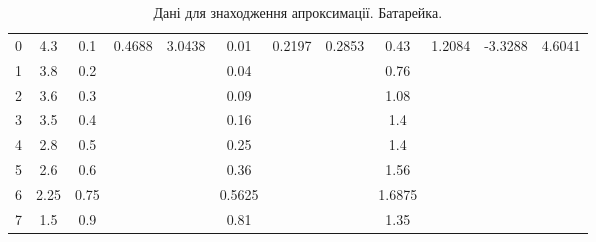 \documentclass[a4paper,12pt]{article}
\begin{document}
\begin{justify}
\begin{table}[htp]
\begin{tabular}{|c|c|c|c|c|c|c|c|c|c|c|c|}
0 & 4.3  & 0.1  & \multirow{8}{*}{0.4688} & \multirow{8}{*}{3.0438} & 0.01   & \multirow{8}{*}{0.2197} & \multirow{8}{*}{0.2853} & 0.43       & \multirow{8}{*}{1.2084}   & \multirow{8}{*}{-3.3288} & \multirow{8}{*}{4.6041} \\ \cline{1-3} \cline{6-6} \cline{9-9}
1 & 3.8  & 0.2  &                         &                         & 0.04   &                         &                         & 0.76       &                           &                          &                         \\ \cline{1-3} \cline{6-6} \cline{9-9}
2 & 3.6  & 0.3  &                         &                         & 0.09   &                         &                         & 1.08       &                           &                          &                         \\ \cline{1-3} \cline{6-6} \cline{9-9}
3 & 3.5  & 0.4  &                         &                         & 0.16   &                         &                         & 1.4        &                           &                          &                         \\ \cline{1-3} \cline{6-6} \cline{9-9}
4 & 2.8  & 0.5  &                         &                         & 0.25   &                         &                         & 1.4        &                           &                          &                         \\ \cline{1-3} \cline{6-6} \cline{9-9}
5 & 2.6  & 0.6  &                         &                         & 0.36   &                         &                         & 1.56       &                           &                          &                         \\ \cline{1-3} \cline{6-6} \cline{9-9}
6 & 2.25 & 0.75 &                         &                         & 0.5625 &                         &                         & 1.6875     &                           &                          &                         \\ \cline{1-3} \cline{6-6} \cline{9-9}
7 & 1.5  & 0.9  &                         &                         & 0.81   &                         &                         & 1.35       &                           &                          &                         \\ \hline
\end{tabular}
\caption{Дані для знаходження апроксимації. Батарейка.}
\label{table:approxb}
\end{table}
\begin{table}[htp]\centering

\end{table}
\end{justify}
\end{document}

